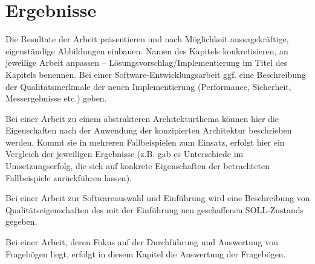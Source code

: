 \chapter{Ergebnisse}
\label{sec:results}

Die Resultate der Arbeit präsentieren und nach Möglichkeit aussagekräftige, eigenständige Abbildungen einbauen. Namen des Kapitels konkretisieren, an jeweilige Arbeit anpassen -- Lösungsvorschlag/Implementierung im Titel des Kapitels benennen. Bei einer Software-Entwicklungsarbeit ggf. eine Beschreibung der Qualitätsmerkmale der neuen Implementierung (Performance, Sicherheit, Messergebnisse etc.) geben.

Bei einer Arbeit zu einem abstrakteren Architekturthema können hier die Eigenschaften nach der Anwendung der konzipierten Architektur beschrieben werden. Kommt sie in mehreren Fallbeispielen zum Einsatz, erfolgt hier ein Vergleich der jeweiligen Ergebnisse (z.B. gab es Unterschiede im Umsetzungserfolg, die sich auf konkrete Eigenschaften der betrachteten Fallbeispiele zurückführen lassen).

Bei einer Arbeit zur Softwareauswahl und Einführung wird eine Beschreibung von Qualitätseigenschaften des mit der Einführung neu geschaffenen SOLL-Zustands gegeben.

Bei einer Arbeit, deren Fokus auf der Durchführung und Auswertung von Fragebögen liegt, erfolgt in diesem Kapitel die Auswertung der Fragebögen.